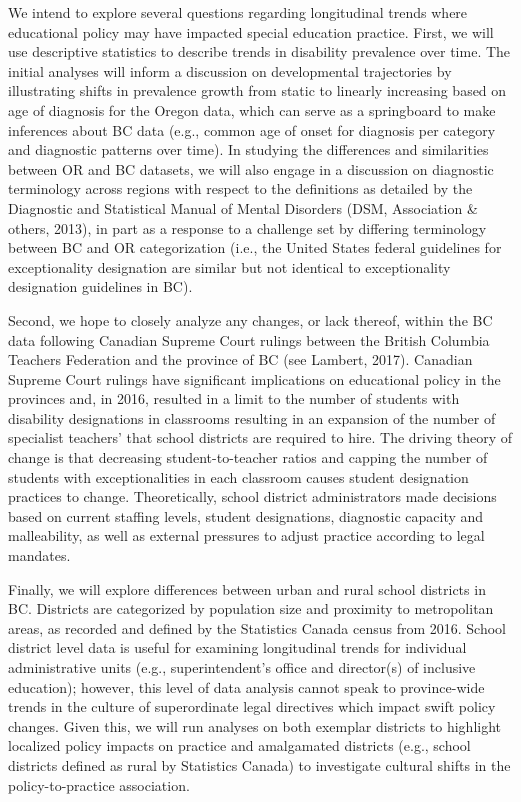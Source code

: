 \documentclass[
  english,
  man,floatsintext]{apa6}
\begin{document}
We intend to explore several questions regarding longitudinal trends where educational policy may have impacted special education practice. First, we will use descriptive statistics to describe trends in disability prevalence over time. The initial analyses will inform a discussion on developmental trajectories by illustrating shifts in prevalence growth from static to linearly increasing based on age of diagnosis for the Oregon data, which can serve as a springboard to make inferences about BC data (e.g., common age of onset for diagnosis per category and diagnostic patterns over time). In studying the differences and similarities between OR and BC datasets, we will also engage in a discussion on diagnostic terminology across regions with respect to the definitions as detailed by the Diagnostic and Statistical Manual of Mental Disorders (DSM, Association \& others, 2013), in part as a response to a challenge set by differing terminology between BC and OR categorization (i.e., the United States federal guidelines for exceptionality designation are similar but not identical to exceptionality designation guidelines in BC).

Second, we hope to closely analyze any changes, or lack thereof, within the BC data following Canadian Supreme Court rulings between the British Columbia Teachers Federation and the province of BC (see Lambert, 2017). Canadian Supreme Court rulings have significant implications on educational policy in the provinces and, in 2016, resulted in a limit to the number of students with disability designations in classrooms resulting in an expansion of the number of specialist teachers' that school districts are required to hire. The driving theory of change is that decreasing student-to-teacher ratios and capping the number of students with exceptionalities in each classroom causes student designation practices to change. Theoretically, school district administrators made decisions based on current staffing levels, student designations, diagnostic capacity and malleability, as well as external pressures to adjust practice according to legal mandates.

Finally, we will explore differences between urban and rural school districts in BC. Districts are categorized by population size and proximity to metropolitan areas, as recorded and defined by the Statistics Canada census from 2016. School district level data is useful for examining longitudinal trends for individual administrative units (e.g., superintendent's office and director(s) of inclusive education); however, this level of data analysis cannot speak to province-wide trends in the culture of superordinate legal directives which impact swift policy changes. Given this, we will run analyses on both exemplar districts to highlight localized policy impacts on practice and amalgamated districts (e.g., school districts defined as rural by Statistics Canada) to investigate cultural shifts in the policy-to-practice association.
\end{document}
